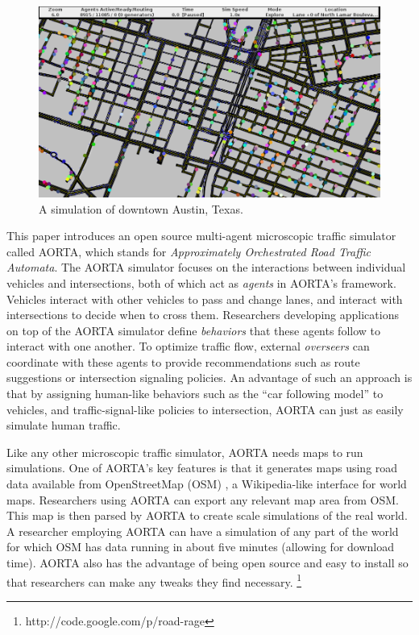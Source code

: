 \documentclass[letterpaper, 10 pt, conference]{ieeeconf}  %
\begin{document}


\begin{figure}[h]
  \centering \includegraphics[width=\linewidth]{downtown_atx.png}
  \caption{A simulation of downtown Austin, Texas.}
  \label{fig:ui_screenshot}
  \vspace{-10pt}
\end{figure}


This paper introduces an open source multi-agent microscopic traffic
simulator called AORTA, which stands for \textit{Approximately
Orchestrated Road Traffic Automata}. The AORTA simulator focuses on
the interactions between individual vehicles and intersections, both
of which act as \textit{agents} in AORTA's framework. Vehicles
interact with other vehicles to pass and change lanes, and interact
with intersections to decide when to cross them. Researchers
developing applications on top of the AORTA simulator define
\textit{behaviors} that these agents follow to interact with one
another. To optimize traffic flow, external \textit{overseers} can
coordinate with these agents to provide recommendations such as route
suggestions or intersection signaling policies.  An advantage of such
an approach is that by assigning human-like behaviors such as the
``car following model'' \cite{brackstone1999car} to vehicles, and
traffic-signal-like policies to intersection, AORTA can just as easily
simulate human traffic.

Like any other microscopic traffic simulator, AORTA needs maps to run
simulations. One of AORTA's key features is that it generates maps using road
data available from OpenStreetMap (OSM) \cite{osm}, a Wikipedia-like interface
for world maps. Researchers using AORTA can export any relevant map area from
OSM. This map is then parsed by AORTA to create scale simulations of the real
world. A researcher employing AORTA can have a simulation of any part of the
world for which OSM has data running in about five minutes (allowing for
download time).  AORTA also has the advantage of being open source and easy to
install so that researchers can make any tweaks they find necessary.
\footnote{http://code.google.com/p/road-rage}
\end{document}
